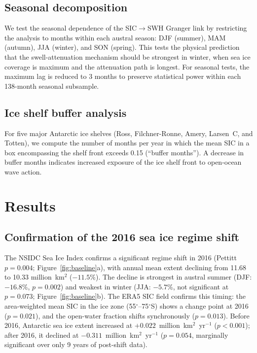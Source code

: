 \documentclass[11pt]{article}
\begin{document}
\subsection{Seasonal decomposition}

We test the seasonal dependence of the SIC$\to$SWH Granger link by restricting the analysis to months within each austral season: DJF (summer), MAM (autumn), JJA (winter), and SON (spring). This tests the physical prediction that the swell-attenuation mechanism should be strongest in winter, when sea ice coverage is maximum and the attenuation path is longest. For seasonal tests, the maximum lag is reduced to 3 months to preserve statistical power within each 138-month seasonal subsample.

\subsection{Ice shelf buffer analysis}

For five major Antarctic ice shelves (Ross, Filchner-Ronne, Amery, Larsen~C, and Totten), we compute the number of months per year in which the mean SIC in a box encompassing the shelf front exceeds 0.15 (``buffer months''). A decrease in buffer months indicates increased exposure of the ice shelf front to open-ocean wave action.

\section{Results}
\label{sec:results}

\subsection{Confirmation of the 2016 sea ice regime shift}

The NSIDC Sea Ice Index confirms a significant regime shift in 2016 (Pettitt $p = 0.004$; Figure~\ref{fig:baseline}a), with annual mean extent declining from 11.68 to 10.33 million~km$^2$ ($-11.5$\%). The decline is strongest in austral summer (DJF: $-16.8$\%, $p = 0.002$) and weakest in winter (JJA: $-5.7$\%, not significant at $p = 0.073$; Figure~\ref{fig:baseline}b). The ERA5 SIC field confirms this timing: the area-weighted mean SIC in the ice zone (55$^\circ$--75$^\circ$S) shows a change point at 2016 ($p = 0.021$), and the open-water fraction shifts synchronously ($p = 0.013$). Before 2016, Antarctic sea ice extent increased at $+0.022$~million~km$^2$~yr$^{-1}$ ($p < 0.001$); after 2016, it declined at $-0.311$~million~km$^2$~yr$^{-1}$ ($p = 0.054$, marginally significant over only 9 years of post-shift data).
\end{document}
